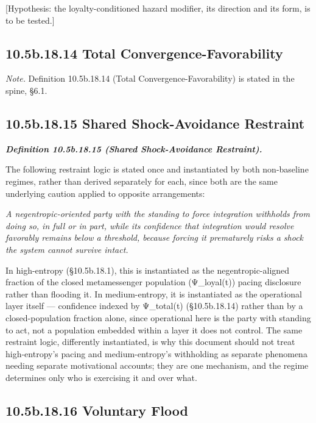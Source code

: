 \documentclass[
]{article}
\begin{document}
{[}Hypothesis: the loyalty-conditioned hazard modifier, its direction
and its form, is to be tested.{]}

\hypertarget{b.18.14-total-convergence-favorability}{%
\subsection{10.5b.18.14 Total
Convergence-Favorability}\label{b.18.14-total-convergence-favorability}}

\emph{Note.} Definition 10.5b.18.14 (Total Convergence-Favorability) is
stated in the spine, §6.1.

\hypertarget{b.18.15-shared-shock-avoidance-restraint}{%
\subsection{10.5b.18.15 Shared Shock-Avoidance
Restraint}\label{b.18.15-shared-shock-avoidance-restraint}}

\emph{\textbf{Definition 10.5b.18.15 (Shared Shock-Avoidance
Restraint).}}

The following restraint logic is stated once and instantiated by both
non-baseline regimes, rather than derived separately for each, since
both are the same underlying caution applied to opposite arrangements:

\emph{A negentropic-oriented party with the standing to force
integration withholds from doing so, in full or in part, while its
confidence that integration would resolve favorably remains below a
threshold, because forcing it prematurely risks a shock the system
cannot survive intact.}

In high-entropy (§10.5b.18.1), this is instantiated as the
negentropic-aligned fraction of the closed metamessenger population
(Ψ\_loyal(t)) pacing disclosure rather than flooding it. In
medium-entropy, it is instantiated as the operational layer itself ---
confidence indexed by Ψ\_total(t) (§10.5b.18.14) rather than by a
closed-population fraction alone, since operational here is the party
with standing to act, not a population embedded within a layer it does
not control. The same restraint logic, differently instantiated, is why
this document should not treat high-entropy's pacing and
medium-entropy's withholding as separate phenomena needing separate
motivational accounts; they are one mechanism, and the regime determines
only who is exercising it and over what.

\hypertarget{b.18.16-voluntary-flood}{%
\subsection{10.5b.18.16 Voluntary Flood}\label{b.18.16-voluntary-flood}}
\end{document}
